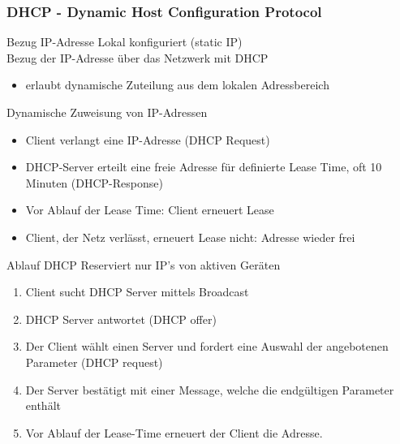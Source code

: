 \columnbreak



\subsubsection{DHCP - Dynamic Host Configuration Protocol}

\begin{definition}{Bezug IP-Adresse} Lokal konfiguriert (static IP)\\
    Bezug der IP-Adresse über das Netzwerk mit DHCP
        \begin{itemize}
            \item erlaubt dynamische Zuteilung aus dem lokalen Adressbereich
        \end{itemize}
\end{definition}

\begin{concept}{Dynamische Zuweisung von IP-Adressen}
    \begin{itemize}
        \item Client verlangt eine IP-Adresse (DHCP Request)
        \item DHCP-Server erteilt eine freie Adresse für definierte Lease Time, oft 10 Minuten (DHCP-Response)
        \item Vor Ablauf der Lease Time: Client erneuert Lease
        \item Client, der Netz verlässt, erneuert Lease nicht: Adresse wieder frei
    \end{itemize}
\end{concept}



\begin{KR}{Ablauf DHCP} Reserviert nur IP’s von aktiven Geräten
    \begin{enumerate}
        \item Client sucht DHCP Server mittels Broadcast
        \item DHCP Server antwortet (DHCP offer)
        \item Der Client wählt einen Server und fordert eine Auswahl der angebotenen Parameter (DHCP request)
        \item Der Server bestätigt mit einer Message, welche die endgültigen Parameter enthält
        \item Vor Ablauf der Lease-Time erneuert der Client die Adresse.
    \end{enumerate}
\end{KR}

